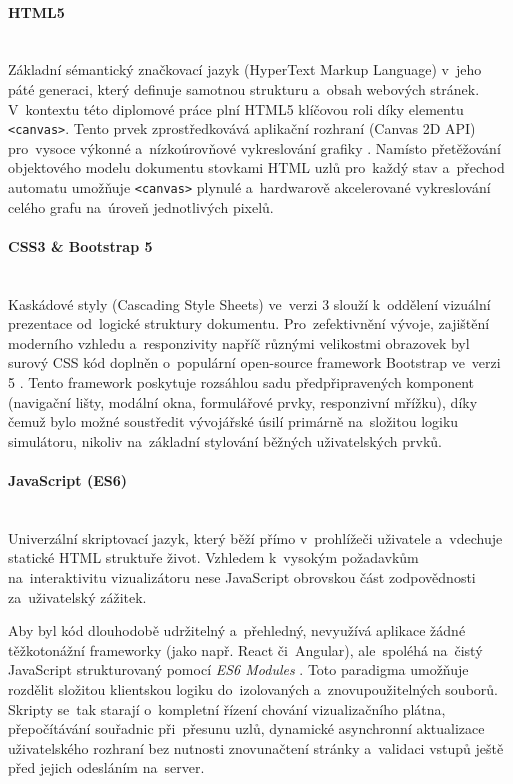 \documentclass[
  master,
  program=ainfvs,
  printversion,
  figures=false,
  tables=false,
  glossaries,
  index
]{kidiplom}
\begin{document}
\paragraph{HTML5} \mbox{} \\
Základní sémantický značkovací jazyk (HyperText Markup Language) v~jeho páté generaci, který definuje samotnou strukturu a~obsah webových stránek. V~kontextu této diplomové práce plní HTML5 klíčovou roli díky elementu \texttt{<can\-vas>}. Tento prvek zprostředkovává aplikační rozhraní (Canvas 2D API) pro~vysoce výkonné a~nízkoúrovňové vykreslování grafiky \cite{w3c_html}. Namísto přetěžování objektového modelu dokumentu stovkami HTML uzlů pro~každý stav a~přechod automatu umožňuje \texttt{<canvas>} plynulé a~hardwarově akcelerované vykreslování celého grafu na~úroveň jednotlivých pixelů.

\paragraph{CSS3 \& Bootstrap 5} \mbox{} \\
Kaskádové styly (Cascading Style Sheets) ve~verzi 3 slouží k~oddělení vizuální prezentace od~logické struktury dokumentu. Pro~zefektivnění vývoje, zajištění moderního vzhledu a~responzivity napříč různými velikostmi obrazovek byl surový CSS kód doplněn o~populární open-source framework Bootstrap ve~verzi 5 \cite{w3c_css,bootstrap_docs}. Tento framework poskytuje rozsáhlou sadu předpřipravených komponent (navigační lišty, modální okna, formulářové prvky, responzivní mřížku), díky čemuž bylo možné soustředit vývojářské úsilí primárně na~složitou logiku simulátoru, nikoliv na~základní stylování běžných uživatelských prvků.

\paragraph{JavaScript (ES6)} \mbox{} \\
Univerzální skriptovací jazyk, který běží přímo v~prohlížeči uživatele a~vdechuje statické HTML struktuře život. Vzhledem k~vysokým požadavkům na~interaktivitu vizualizátoru nese JavaScript obrovskou část zodpovědnosti za~uživatelský zážitek. 

Aby byl kód dlouhodobě udržitelný a~přehledný, nevyužívá aplikace žádné těžkotonážní frameworky (jako např. React či~Angular), ale~spoléhá na~čistý JavaScript strukturovaný pomocí \textit{ES6 Modules} \cite{mdn_js}. Toto paradigma umožňuje rozdělit složitou klientskou logiku do~izolovaných a~znovupoužitelných souborů. Skripty se~tak starají o~kompletní řízení chování vizualizačního plátna, přepočítávání souřadnic při~přesunu uzlů, dynamické asynchronní aktualizace uživatelského rozhraní bez nutnosti znovunačtení stránky a~validaci vstupů ještě před jejich odesláním na~server.
\end{document}
